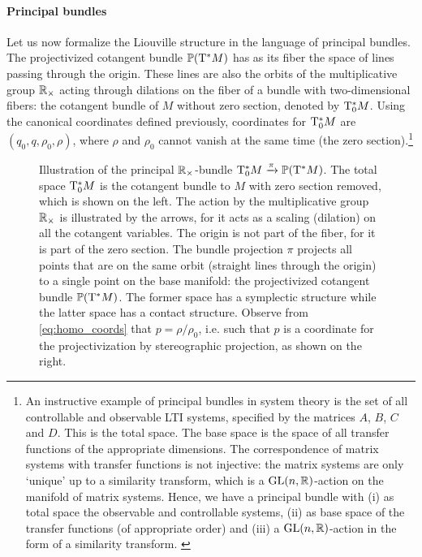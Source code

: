 \paragraph{Principal bundles}
Let us now formalize the Liouville structure in the language of principal bundles. The projectivized cotangent bundle $\mathbb{P}\qty(\mathrm{T}^*M)$ has as its fiber the space of lines passing through the origin. These lines are also the orbits of the multiplicative group $\mathbb{R}_{\times}$ acting through dilations on the fiber of a bundle with two-dimensional fibers: the cotangent bundle of $M$ without zero section, denoted by $\mathrm{T}^*_0M$. Using the canonical coordinates defined previously, coordinates for $\mathrm{T}^*_0M$ are $(q_0, q, \rho_0, \rho)$, where $\rho$ and $\rho_0$ cannot vanish at the same time (the zero section).\footnote
{An instructive example of principal bundles in system theory is the set of all controllable and observable LTI systems, specified by the matrices $A$, $B$, $C$ and $D$. This is the total space. The base space is the space of all transfer functions of the appropriate dimensions. The correspondence of matrix systems with transfer functions is not injective: the matrix systems are only `unique' up to a similarity transform, which is a $\mathrm{GL}(n, \mathbb{R})$-action on the manifold of matrix systems. Hence, we have a principal bundle with (i) as total space the observable and controllable systems, (ii) as base space of the transfer functions (of appropriate order) and (iii) a $\mathrm{GL}(n, \mathbb{R})$-action in the form of a similarity transform. \cite{Hermann1984}}
\begin{figure}[h!]
    \centering
    
    \caption{Illustration of the principal $\mathbb{R}_{\times}$-bundle $\mathrm{T}^*_0M\xrightarrow[]{\pi}\mathbb{P}\qty(\mathrm{T}^*M)$. The total space $\mathrm{T}^*_0M$ is the cotangent bundle to $M$ with zero section removed, which is shown on the left. The action by the multiplicative group $\mathbb{R}_{\times}$ is illustrated by the arrows, for it acts as a scaling (dilation) on all the cotangent variables. The origin is not part of the fiber, for it is part of the zero section. The bundle projection $\pi$ projects all points that are on the same orbit (straight lines through the origin) to a single point on the base manifold: the projectivized cotangent bundle $\mathbb{P}\qty(\mathrm{T}^*M)$. The former space has a symplectic structure while the latter space has a contact structure. Observe from \cref{eq:homo_coords} that $p = \rho/\rho_0$, i.e. such that $p$ is a coordinate for the projectivization by stereographic projection, as shown on the right.}
    \label{fig:principal_bundle}
\end{figure}

